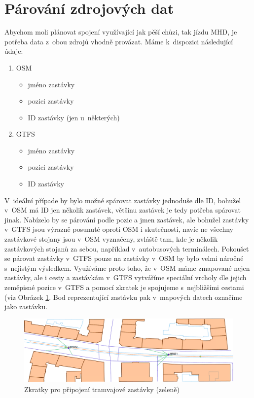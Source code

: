 \section{Párování zdrojových dat}
Abychom moli plánovat spojení využívající jak pěší chůzi, tak jízdu MHD, je
potřeba data z~obou zdrojů vhodně provázat. Máme k~dispozici následující údaje:
\begin{enumerate}
\item OSM
\begin{itemize}
	\item jméno zastávky
	\item pozici zastávky
	\item ID zastávky (jen u~některých)
\end{itemize}
\item GTFS
\begin{itemize}
	\item jméno zastávky
	\item pozici zastávky
	\item ID zastávky
\end{itemize}
\end{enumerate} 
V~ideální případe by bylo možné spárovat zastávky jednoduše dle ID, bohužel
v~OSM má ID jen několik zastávek, většinu zastávek je tedy potřeba spárovat jinak.
Nabízelo by se párování podle pozic a jmen zastávek, ale bohužel zastávky v~GTFS
jsou výrazně posunuté oproti OSM i skutečnosti, navíc ne všechny zastávkové
stojany jsou v~OSM vyznačeny, zvláště tam, kde je několik zastávkových stojanů
za sebou, například v~autobusových terminálech. Pokoušet se párovat zastávky
v~GTFS pouze na zastávky v~OSM by bylo velmi náročné s~nejistým výsledkem.
Využíváme proto toho, že v~OSM máme zmapované nejen zastávky, ale i cesty a
zastávkám v~GTFS vytváříme speciální vrcholy dle jejich zeměpisné pozice v~GTFS
a pomocí zkratek je spojujeme s~nejbližšími cestami (viz Obrázek
\ref{fig:zastavka}. Bod reprezentující zastávku pak v~mapových datech označíme
jako zastávku.

\begin{figure}
  \centering
    \includegraphics[width=\textwidth]{../img/tramvaj.pdf}
  \caption{Zkratky pro připojení tramvajové zastávky (zeleně)}
  \label{fig:zastavka}
\end{figure}

